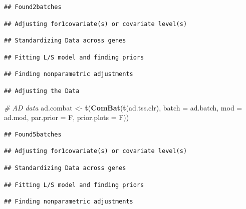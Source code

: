 \documentclass[]{book}
\newenvironment{Shaded}{\begin{snugshade}}{\end{snugshade}}
\newcommand{\KeywordTok}[1]{\textcolor[rgb]{0.13,0.29,0.53}{\textbf{#1}}}
\newcommand{\DataTypeTok}[1]{\textcolor[rgb]{0.13,0.29,0.53}{#1}}
\newcommand{\StringTok}[1]{\textcolor[rgb]{0.31,0.60,0.02}{#1}}
\newcommand{\CommentTok}[1]{\textcolor[rgb]{0.56,0.35,0.01}{\textit{#1}}}
\newcommand{\NormalTok}[1]{#1}
\begin{document}
\begin{verbatim}
## Found2batches
\end{verbatim}

\begin{verbatim}
## Adjusting for1covariate(s) or covariate level(s)
\end{verbatim}

\begin{verbatim}
## Standardizing Data across genes
\end{verbatim}

\begin{verbatim}
## Fitting L/S model and finding priors
\end{verbatim}

\begin{verbatim}
## Finding nonparametric adjustments
\end{verbatim}

\begin{verbatim}
## Adjusting the Data
\end{verbatim}

\begin{Shaded}
\begin{Highlighting}[]
\CommentTok{# AD data}
\NormalTok{ad.combat <-}\StringTok{ }\KeywordTok{t}\NormalTok{(}\KeywordTok{ComBat}\NormalTok{(}\KeywordTok{t}\NormalTok{(ad.tss.clr), }\DataTypeTok{batch =}\NormalTok{ ad.batch, }
                      \DataTypeTok{mod =}\NormalTok{ ad.mod, }\DataTypeTok{par.prior =}\NormalTok{ F, }\DataTypeTok{prior.plots =}\NormalTok{ F))}
\end{Highlighting}
\end{Shaded}

\begin{verbatim}
## Found5batches
\end{verbatim}

\begin{verbatim}
## Adjusting for1covariate(s) or covariate level(s)
\end{verbatim}

\begin{verbatim}
## Standardizing Data across genes
\end{verbatim}

\begin{verbatim}
## Fitting L/S model and finding priors
\end{verbatim}

\begin{verbatim}
## Finding nonparametric adjustments
\end{verbatim}
\end{document}
